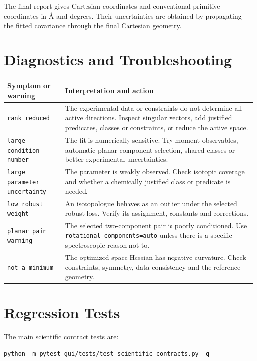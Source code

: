 \documentclass[11pt]{article}
\newcommand{\angstrom}{\text{\AA}}
\begin{document}
The final report gives Cartesian coordinates and conventional primitive
coordinates in \(\angstrom\) and degrees.  Their uncertainties are obtained by
propagating the fitted covariance through the final Cartesian geometry.

\section{Diagnostics and Troubleshooting}

\begin{longtable}{@{}p{}p{}@{}}
\toprule
Symptom or warning & Interpretation and action \\
\midrule
\endhead
\texttt{rank reduced} & The experimental data or constraints do not determine
all active directions.  Inspect singular vectors, add justified predicates,
classes or constraints, or reduce the active space. \\
\texttt{large condition number} & The fit is numerically sensitive.  Try
moment observables, automatic planar-component selection, shared classes or
better experimental uncertainties. \\
\texttt{large parameter uncertainty} & The parameter is weakly observed.
Check isotopic coverage and whether a chemically justified class or predicate
is needed. \\
\texttt{low robust weight} & An isotopologue behaves as an outlier under the
selected robust loss.  Verify its assignment, constants and corrections. \\
\texttt{planar pair warning} & The selected two-component pair is poorly
conditioned.  Use \texttt{rotational\_components=auto} unless there is a
specific spectroscopic reason not to. \\
\texttt{not a minimum} & The optimized-space Hessian has negative curvature.
Check constraints, symmetry, data consistency and the reference geometry. \\
\bottomrule
\end{longtable}

\section{Regression Tests}

The main scientific contract tests are:

\begin{lstlisting}[style=oracle]
python -m pytest gui/tests/test_scientific_contracts.py -q
\end{lstlisting}
\end{document}
